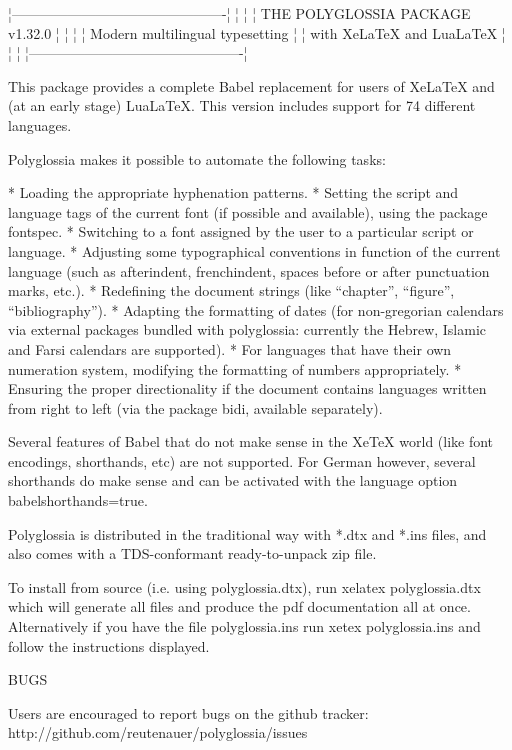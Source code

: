 
   ¦----------------------------------------------¦
   ¦                                              ¦
   ¦       THE POLYGLOSSIA PACKAGE v1.32.0        ¦
   ¦                                              ¦
   ¦     Modern multilingual typesetting          ¦
   ¦        with XeLaTeX and LuaLaTeX             ¦
   ¦                                              ¦
   ¦----------------------------------------------¦

This package provides a complete Babel replacement for users of XeLaTeX and
(at an early stage) LuaLaTeX. This version includes support for 74 different
languages.

Polyglossia makes it possible to automate the following tasks:

* Loading the appropriate hyphenation patterns.
* Setting the script and language tags of the current font (if possible and
  available), using the package fontspec.
* Switching to a font assigned by the user to a particular script or language.
* Adjusting some typographical conventions in function of the current language
  (such as afterindent, frenchindent, spaces before or after punctuation marks,
  etc.).
* Redefining the document strings (like “chapter”, “figure”, “bibliography”).
* Adapting the formatting of dates (for non-gregorian calendars via external
  packages bundled with polyglossia: currently the Hebrew, Islamic and Farsi
  calendars are supported).
* For languages that have their own numeration system, modifying the formatting
  of numbers appropriately.
* Ensuring the proper directionality if the document contains languages
  written from right to left (via the package bidi, available separately).

Several features of Babel that do not make sense in the XeTeX world (like font
encodings, shorthands, etc) are not supported. For German however, several
shorthands do make sense and can be activated with the language option
babelshorthands=true.

Polyglossia is distributed in the traditional way with *.dtx and *.ins files,
and also comes with a TDS-conformant ready-to-unpack zip file.

To install from source (i.e. using polyglossia.dtx), run
xelatex polyglossia.dtx
which will generate all files and produce the pdf documentation all at once.
Alternatively if you have the file polyglossia.ins run
xetex polyglossia.ins
and follow the instructions displayed.

BUGS

Users are encouraged to report bugs on the github tracker:
http://github.com/reutenauer/polyglossia/issues


